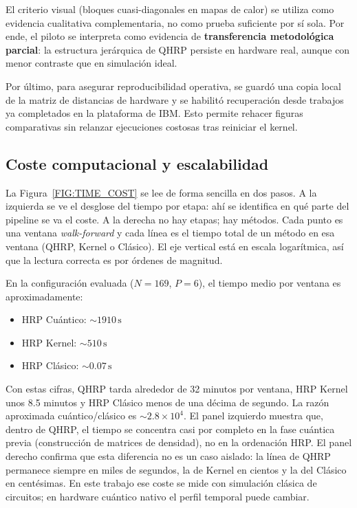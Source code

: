 El criterio visual (bloques cuasi-diagonales en mapas de calor) se utiliza como evidencia cualitativa complementaria, no como prueba suficiente por sí sola. Por ende, el piloto se interpreta como evidencia de \textbf{transferencia metodológica parcial}: la estructura jerárquica de QHRP persiste en hardware real, aunque con menor contraste que en simulación ideal.

Por último, para asegurar reproducibilidad operativa, se guardó una copia local de la matriz de distancias de hardware y se habilitó recuperación desde trabajos ya completados en la plataforma de IBM. Esto permite rehacer figuras comparativas sin relanzar ejecuciones costosas tras reiniciar el kernel.

\subsection{Coste computacional y escalabilidad}
La Figura~\ref{FIG:TIME_COST} se lee de forma sencilla en dos pasos. A la izquierda se ve el desglose del tiempo por etapa: ahí se identifica en qué parte del pipeline se va el coste. A la derecha no hay etapas; hay métodos. Cada punto es una ventana \textit{walk-forward} y cada línea es el tiempo total de un método en esa ventana (QHRP, Kernel o Clásico). El eje vertical está en escala logarítmica, así que la lectura correcta es por órdenes de magnitud.

En la configuración evaluada ($N=169$, $P=6$), el tiempo medio por ventana es aproximadamente:

\begin{itemize}
	\item HRP Cuántico: \(\sim 1910\,\mathrm{s}\)
	\item HRP Kernel: \(\sim 510\,\mathrm{s}\)
	\item HRP Clásico: \(\sim 0.07\,\mathrm{s}\)
\end{itemize}

Con estas cifras, QHRP tarda alrededor de 32 minutos por ventana, HRP Kernel unos 8.5 minutos y HRP Clásico menos de una décima de segundo. La razón aproximada cuántico/clásico es \(\sim 2.8\times 10^4\). El panel izquierdo muestra que, dentro de QHRP, el tiempo se concentra casi por completo en la fase cuántica previa (construcción de matrices de densidad), no en la ordenación HRP. El panel derecho confirma que esta diferencia no es un caso aislado: la línea de QHRP permanece siempre en miles de segundos, la de Kernel en cientos y la del Clásico en centésimas. En este trabajo ese coste se mide con simulación clásica de circuitos; en hardware cuántico nativo el perfil temporal puede cambiar.

